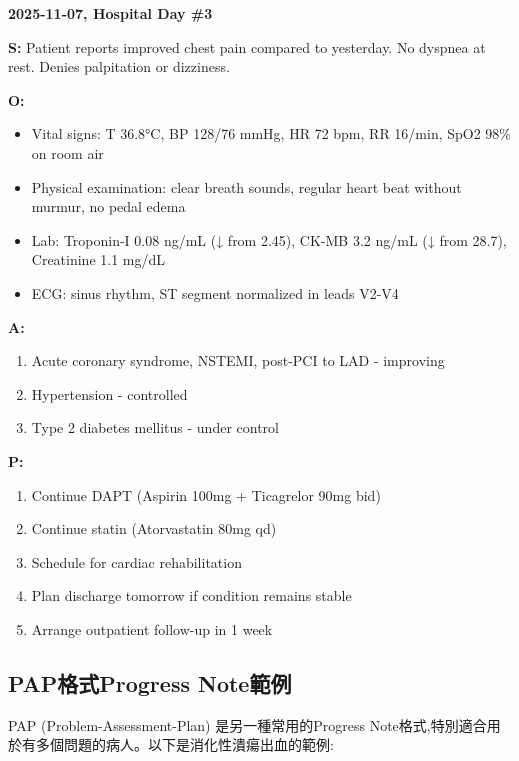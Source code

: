 \documentclass[12pt,a4paper]{article}
\begin{document}
\begin{mdframed}[linecolor=emergency_gray,linewidth=1pt]
\textbf{2025-11-07, Hospital Day \#3}

\textbf{S:}
Patient reports improved chest pain compared to yesterday. No dyspnea at rest. Denies palpitation or dizziness.

\textbf{O:}
\begin{itemize}[nosep]
\item Vital signs: T 36.8°C, BP 128/76 mmHg, HR 72 bpm, RR 16/min, SpO2 98\% on room air
\item Physical examination: clear breath sounds, regular heart beat without murmur, no pedal edema
\item Lab: Troponin-I 0.08 ng/mL (↓ from 2.45), CK-MB 3.2 ng/mL (↓ from 28.7), Creatinine 1.1 mg/dL
\item ECG: sinus rhythm, ST segment normalized in leads V2-V4
\end{itemize}

\textbf{A:}
\begin{enumerate}[nosep]
\item Acute coronary syndrome, NSTEMI, post-PCI to LAD - improving
\item Hypertension - controlled
\item Type 2 diabetes mellitus - under control
\end{enumerate}

\textbf{P:}
\begin{enumerate}[nosep]
\item Continue DAPT (Aspirin 100mg + Ticagrelor 90mg bid)
\item Continue statin (Atorvastatin 80mg qd)
\item Schedule for cardiac rehabilitation
\item Plan discharge tomorrow if condition remains stable
\item Arrange outpatient follow-up in 1 week
\end{enumerate}
\end{mdframed}

\newpage


\subsection{PAP格式Progress Note範例}

PAP (Problem-Assessment-Plan) 是另一種常用的Progress Note格式,特別適合用於有多個問題的病人。以下是消化性潰瘍出血的範例:
\end{document}
